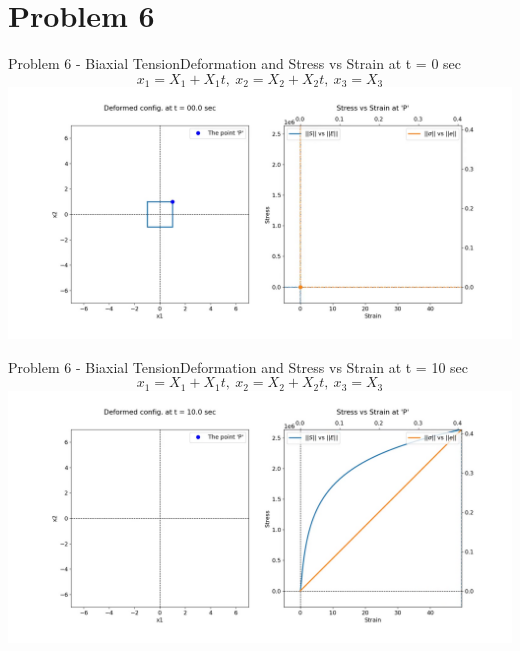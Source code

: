 \documentclass{beamer}
\begin{document}
\section{Problem 6}

\begin{frame}{Problem 6 - Biaxial Tension}{Deformation and Stress vs Strain at t = 0 sec}
    \vspace{-1em}
    \scriptsize $$x_1 = X_1 + X_1t,\ x_2 = X_2 + X_2t,\ x_3 = X_3$$
    \includegraphics[width=\textwidth, trim={4.5cm 2cm 3cm 1cm}, clip]{Plots/ibitension.jpg}
\end{frame}

\begin{frame}{Problem 6 - Biaxial Tension}{Deformation and Stress vs Strain at t = 10 sec}
    \vspace{-1em}
    \scriptsize $$x_1 = X_1 + X_1t,\ x_2 = X_2 + X_2t,\ x_3 = X_3$$
    \includegraphics[width=\textwidth, trim={4.5cm 2cm 3cm 1cm}, clip]{Plots/bitension.jpg}
\end{frame}
\end{document}
